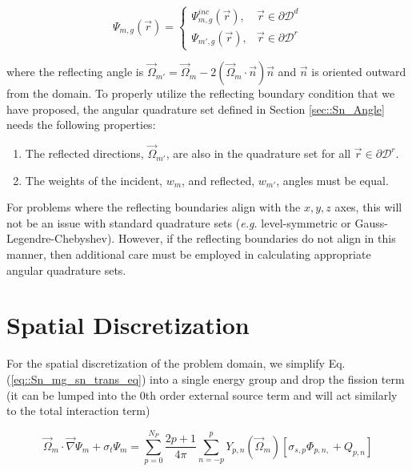 \begin{equation}
\label{eq::Sn_simple_BC}
\Psi_{m,g} (\vec{r}) = \begin{cases}
	\Psi^{inc}_{m,g} (\vec{r}) , & \vec{r} \in \partial \mathcal{D}^d \\
	\Psi_{m',g} (\vec{r}) , & \vec{r} \in \partial \mathcal{D}^r
\end{cases}
\end{equation}

\noindent where the reflecting angle is $\vec{\Omega}_{m'} = \vec{\Omega}_{m} - 2 \left(  \vec{\Omega}_{m} \cdot \vec{n} \right) \vec{n}$ and $\vec{n}$ is oriented outward from the domain. To properly utilize the reflecting boundary condition that we have proposed, the angular quadrature set defined in Section \ref{sec::Sn_Angle} needs the following properties:

\begin{enumerate}
 	\item The reflected directions, $\vec{\Omega}_{m'}$, are also in the quadrature set for all $\vec{r} \in \partial \mathcal{D}^r$.
	\item The weights of the incident, $w_m$, and reflected, $w_{m'}$, angles must be equal.
\end{enumerate} 

\noindent For problems where the reflecting boundaries align with the $x,y,z$ axes, this will not be an issue with standard quadrature sets ({\em e.g.} level-symmetric or Gauss-Legendre-Chebyshev). However, if the reflecting boundaries do not align in this manner, then additional care must be employed in calculating appropriate angular quadrature sets.

\section{Spatial Discretization}
\label{sec::Sn_Spatial}

For the spatial discretization of the problem domain, we simplify Eq. (\ref{eq::Sn_mg_sn_trans_eq}) into a single energy group and drop the fission term (it can be lumped into the 0th order external source term and will act similarly to the total interaction term)

\begin{equation}
\label{eq::Sn_trans_eq_simple_no_energy_groups}
\vec{\Omega}_m \cdot \vec{\nabla} \Psi_{m}  + \sigma_{t}   \Psi_{m}=  \sum_{p=0}^{N_P} \frac{2p + 1}{4 \pi}    \sum_{n=-p}^{p}  Y_{p,n} (  \vec{\Omega}_m ) \left[ \sigma_{s,p}  \Phi_{p,n,}  + Q_{p,n} \right]
\end{equation}

